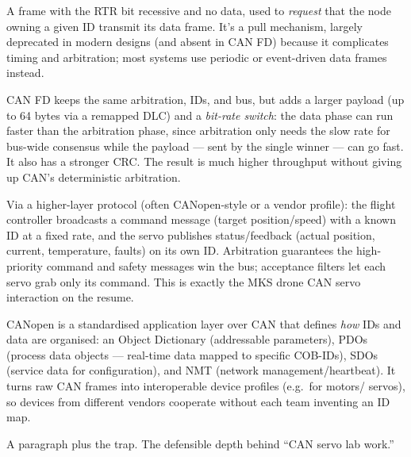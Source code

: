 A frame with the RTR bit recessive and no data, used to \emph{request} that the
node owning a given ID transmit its data frame. It's a pull mechanism, largely
deprecated in modern designs (and absent in CAN FD) because it complicates
timing and arbitration; most systems use periodic or event-driven data frames
instead.

CAN FD keeps the same arbitration, IDs, and bus, but adds a larger payload (up
to 64 bytes via a remapped DLC) and a \emph{bit-rate switch}: the data phase can
run faster than the arbitration phase, since arbitration only needs the slow
rate for bus-wide consensus while the payload --- sent by the single winner ---
can go fast. It also has a stronger CRC. The result is much higher throughput
without giving up CAN's deterministic arbitration.

Via a higher-layer protocol (often CANopen-style or a vendor profile): the
flight controller broadcasts a command message (target position/speed) with a
known ID at a fixed rate, and the servo publishes status/feedback (actual
position, current, temperature, faults) on its own ID. Arbitration guarantees
the high-priority command and safety messages win the bus; acceptance filters
let each servo grab only its command. This is exactly the MKS drone CAN servo
interaction on the resume.

CANopen is a standardised application layer over CAN that defines \emph{how} IDs
and data are organised: an Object Dictionary (addressable parameters), PDOs
(process data objects --- real-time data mapped to specific COB-IDs), SDOs
(service data for configuration), and NMT (network management/heartbeat). It
turns raw CAN frames into interoperable device profiles (e.g.\ for motors/
servos), so devices from different vendors cooperate without each team
inventing an ID map.

%
{A paragraph plus the trap. The defensible depth behind ``CAN servo lab work.''}

